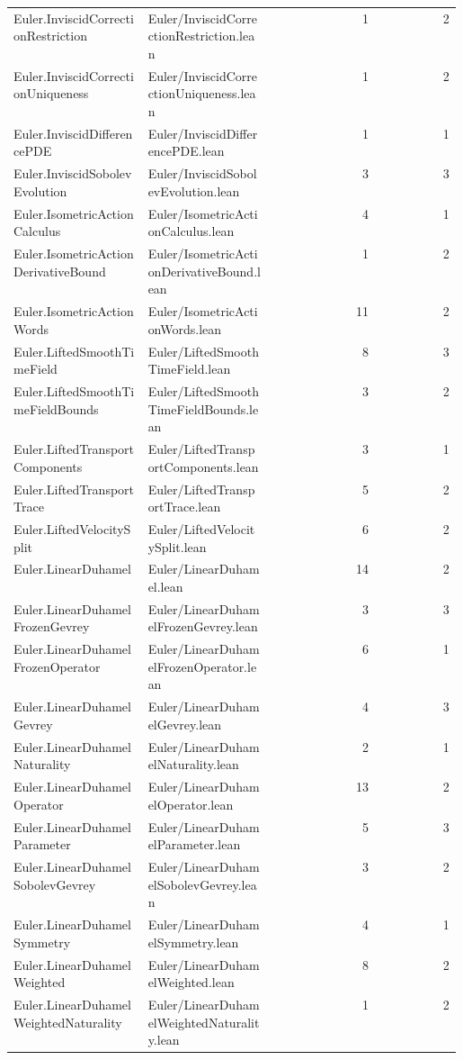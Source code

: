 \begin{longtable}{p{0.30\linewidth}p{0.28\linewidth}rr}
Euler.InviscidCorrectionRestriction & Euler/InviscidCorrectionRestriction.lean & 1 & 2\\
Euler.InviscidCorrectionUniqueness & Euler/InviscidCorrectionUniqueness.lean & 1 & 2\\
Euler.InviscidDifferencePDE & Euler/InviscidDifferencePDE.lean & 1 & 1\\
Euler.InviscidSobolevEvolution & Euler/InviscidSobolevEvolution.lean & 3 & 3\\
Euler.IsometricActionCalculus & Euler/IsometricActionCalculus.lean & 4 & 1\\
Euler.IsometricActionDerivativeBound & Euler/IsometricActionDerivativeBound.lean & 1 & 2\\
Euler.IsometricActionWords & Euler/IsometricActionWords.lean & 11 & 2\\
Euler.LiftedSmoothTimeField & Euler/LiftedSmoothTimeField.lean & 8 & 3\\
Euler.LiftedSmoothTimeFieldBounds & Euler/LiftedSmoothTimeFieldBounds.lean & 3 & 2\\
Euler.LiftedTransportComponents & Euler/LiftedTransportComponents.lean & 3 & 1\\
Euler.LiftedTransportTrace & Euler/LiftedTransportTrace.lean & 5 & 2\\
Euler.LiftedVelocitySplit & Euler/LiftedVelocitySplit.lean & 6 & 2\\
Euler.LinearDuhamel & Euler/LinearDuhamel.lean & 14 & 2\\
Euler.LinearDuhamelFrozenGevrey & Euler/LinearDuhamelFrozenGevrey.lean & 3 & 3\\
Euler.LinearDuhamelFrozenOperator & Euler/LinearDuhamelFrozenOperator.lean & 6 & 1\\
Euler.LinearDuhamelGevrey & Euler/LinearDuhamelGevrey.lean & 4 & 3\\
Euler.LinearDuhamelNaturality & Euler/LinearDuhamelNaturality.lean & 2 & 1\\
Euler.LinearDuhamelOperator & Euler/LinearDuhamelOperator.lean & 13 & 2\\
Euler.LinearDuhamelParameter & Euler/LinearDuhamelParameter.lean & 5 & 3\\
Euler.LinearDuhamelSobolevGevrey & Euler/LinearDuhamelSobolevGevrey.lean & 3 & 2\\
Euler.LinearDuhamelSymmetry & Euler/LinearDuhamelSymmetry.lean & 4 & 1\\
Euler.LinearDuhamelWeighted & Euler/LinearDuhamelWeighted.lean & 8 & 2\\
Euler.LinearDuhamelWeightedNaturality & Euler/LinearDuhamelWeightedNaturality.lean & 1 & 2\\

\end{longtable}
